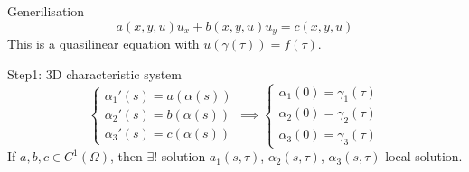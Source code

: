 \documentclass[a4paper]{article}
\theoremstyle{definition}
\begin{document}
	Generilisation
	\begin{equation}
		a\left( x,y,u \right) u_{x}+b\left( x,y,u \right) u_{y}=c\left( x,y,u \right) 
	\end{equation} 
	This is a quasilinear equation with $u\left( \gamma\left( \tau \right)  \right) =f\left( \tau \right) $. 
	
	Step1: 3D characteristic system
	\begin{equation}
		\begin{cases}
			\alpha_1'\left( s \right) =a\left( \alpha\left( s \right)  \right) \\
			\alpha_2'\left( s \right) =b\left( \alpha\left( s \right)  \right) \\
			\alpha_3'\left( s \right) =c\left( \alpha\left( s \right)  \right) 
		\end{cases}\implies \begin{cases}
		\alpha_1\left( 0 \right) =\gamma_1\left( \tau \right) \\
		\alpha_2\left( 0 \right)=\gamma_2\left( \tau \right) \\
		\alpha_3\left( 0 \right) =\gamma_3\left( \tau \right) 
		\end{cases}
	\end{equation} 
	If $a,b,c \in C^{1}\left(\Omega \right) $, then $\exists ! $ solution $a_1\left( s,\tau \right) $, $\alpha_2\left( s,\tau \right) $, $\alpha_3\left( s,\tau \right) $ local solution. 
\end{document}
